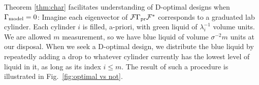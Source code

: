 Theorem \ref{thm:char} facilitates understanding of D-optimal designs
when $\Gamma_{\textup{model}} = 0$: Imagine each eigenvector of $\mathcal{F} \Gamma_{\textup{pr}} \mathcal{F}^*$
corresponds to a graduated lab cylinder.
Each cylinder $i$ is filled, a-priori, with green liquid of
$\lambda_i^{-1}$ volume units. We are allowed $m$ measurement, so we
have blue liquid of volume $\sigma^{-2}m$ units at our disposal. When
we seek a D-optimal design, we distribute the blue liquid by
repeatedly adding a drop to whatever cylinder currently has the lowest
level of liquid in it, as long as its index $i \leq m$. The result of
such a procedure is illustrated in Fig.~\ref{fig:optimal vs not}.


